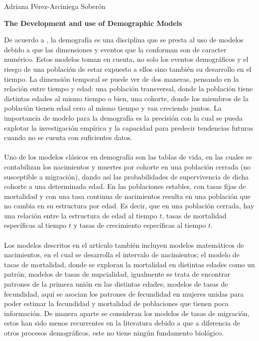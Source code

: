 \documentclass[11pt,spanish,letterpaper]{article}
\theoremstyle{plain}
\begin{document}
\begin{flushleft}
Adriana P\'erez-Arciniega Sober\'on
\end{flushleft}
\begin{center}
\textbf{The Development and use of Demographic Models}
\end{center} 
De acuerdo a \cite{coale1996development}, la demograf\'ia es una disciplina que se presta al uso de modelos debido a que las dimensiones y eventos que la conforman son de caracter num\'erico. Estos modelos toman en cuenta, no solo los eventos demogr\'aficos y el riesgo de una poblaci\'on de estar expuesto a ellos sino tambi\'en su desarrollo en el tiempo. La dimensi\'on temporal se puede ver de dos maneras, pensando en la relaci\'on entre tiempo y edad: una poblaci\'on transversal, donde la poblaci\'on tiene distintas edades al mismo tiempo o bien, una cohorte, donde los miembros de la poblaci\'on tienen edad cero al mismo tiempo y van creciendo juntos. La importancia de modelo para la demograf\'ia es la precisi\'on con la cual se pueda explotar la investigaci\'on emp\'irica y la capacidad para predecir tendencias futuras cuando no se cuenta con suficientes datos.\\
\\
Uno de los modelos cl\'asicos en demograf\'ia son las tablas de vida, en las cuales se contabilizan los nacimientos y muertes por cohorte en una poblaci\'on cerrada (no susceptible a migraci\'on), dando as\'i las probabilidades de supervivencia de dicha cohorte a una determinada edad. En las poblaciones estables, con tasas fijas de mortalidad y con una tasa continua de nacimientos resulta en una poblaci\'on que no cambia en su estructura por edad. Es decir, que en una poblaci\'on cerrada, hay una relaci\'on entre la estructura de edad al tiempo $t$, tasas de mortalidad espec\'ificas al tiempo $t$ y tasas de crecimiento espec\'ificas al tiempo $t$.\\
\\
Los modelos descritos en el art\'iculo tambi\'en incluyen modelos matem\'aticos de nacimientos, en el cual se desarrolla el intervalo de nacimientos; el modelo de tasas de mortalidad, donde se exploran la mortalidad en distintas edades como un patr\'on; modelos de tasas de nupcialidad, igualmente se trata de encontrar patrones de la primera uni\'on en las distintas edades; modelos de tasas de fecundidad, aqu\'i se asocian los patrones de fecundidad en mujeres unidas para poder estimar la fecundidad y mortalidad de poblaciones que tienen poca informaci\'on. De manera aparte se consideran los modelos de tasas de migraci\'on, estos han sido menos recurrentes en la literatura debido a que a diferencia de otros procesos demogr\'aficos, este no tiene ning\'un fundamento biol\'ogico.\\
\end{document}

